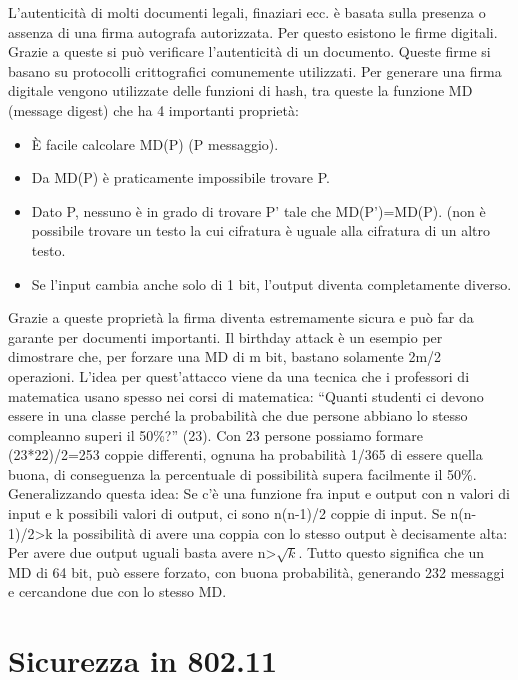 L’autenticità di molti documenti legali, finaziari ecc. è basata sulla presenza o assenza di una firma autografa autorizzata. Per questo esistono le firme digitali. Grazie a queste si può verificare l’autenticità di un documento. Queste firme si basano su protocolli crittografici comunemente utilizzati.
Per generare una firma digitale vengono utilizzate delle funzioni di hash, tra queste la funzione MD (message digest) che ha 4 importanti proprietà:
\begin{itemize}
\item	È facile calcolare MD(P) (P messaggio).
\item	Da MD(P) è praticamente impossibile trovare P.
\item	Dato P, nessuno è in grado di trovare P’ tale che MD(P’)=MD(P). (non è possibile trovare un testo la cui cifratura è uguale alla cifratura di un altro testo.
\item	Se l’input cambia anche solo di 1 bit, l’output diventa completamente diverso.
\end{itemize}
Grazie a queste proprietà la firma diventa estremamente sicura e può far da garante per documenti importanti.
Il birthday attack è un esempio per dimostrare che, per forzare una MD di m bit, bastano solamente 2m/2 operazioni. L’idea per quest’attacco viene da una tecnica che i professori di matematica usano spesso nei corsi di matematica: “Quanti studenti ci devono essere in una classe perché la probabilità che due persone abbiano lo stesso compleanno superi il 50\%?” (23).
Con 23 persone possiamo formare (23*22)/2=253 coppie differenti, ognuna ha probabilità 1/365 di essere quella buona, di conseguenza la percentuale di possibilità supera facilmente il 50\%.
Generalizzando questa idea: Se c’è una funzione fra input e output con n valori di input e k possibili valori di output, ci sono n(n-1)/2 coppie di input. Se n(n-1)/2>k la possibilità di avere una coppia con lo stesso output è decisamente alta: Per avere due output uguali basta avere n>$\sqrt{k}$.
Tutto questo significa che un MD di 64 bit, può essere forzato, con buona probabilità, generando 232 messaggi e cercandone due con lo stesso MD.
\section{Sicurezza in 802.11}

